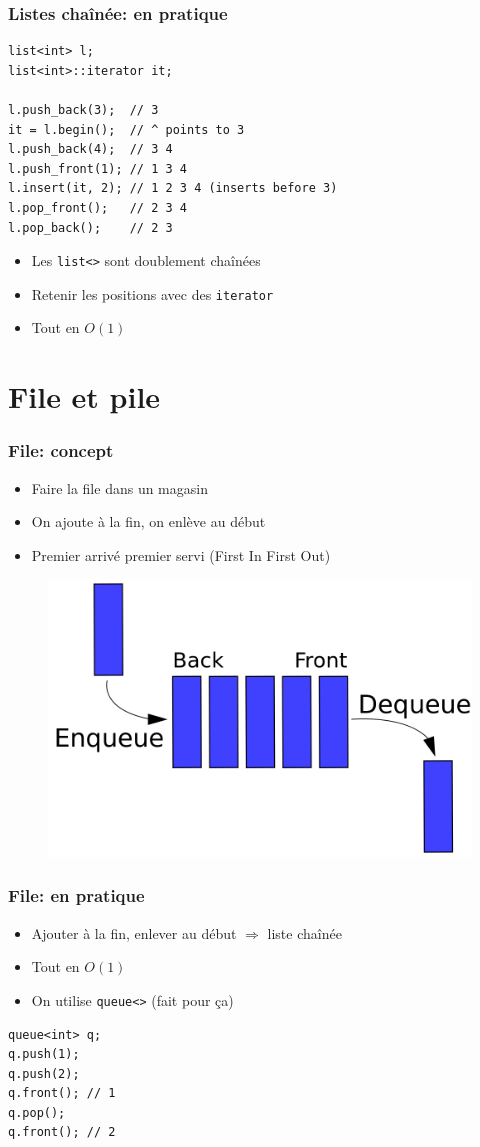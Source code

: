 \documentclass[12pt]{beamer}
\begin{document}
\begin{frame}[fragile]
\frametitle{Listes chaînée: en pratique}
\begin{lstlisting}
list<int> l;
list<int>::iterator it;

l.push_back(3);  // 3
it = l.begin();  // ^ points to 3
l.push_back(4);  // 3 4
l.push_front(1); // 1 3 4
l.insert(it, 2); // 1 2 3 4 (inserts before 3)
l.pop_front();   // 2 3 4
l.pop_back();    // 2 3
\end{lstlisting}
\begin{itemize}
\item Les \texttt{list<>} sont doublement chaînées
\item Retenir les positions avec des \texttt{iterator}
\item Tout en $O(1)$
\end{itemize}
\end{frame}

\section{File et pile}

\begin{frame}
\frametitle{File: concept}
\begin{itemize}
\item Faire la file dans un magasin
\item On ajoute à la fin, on enlève au début
\item Premier arrivé premier servi (First In First Out)
\end{itemize}
\begin{figure}
\centering
\includegraphics[width=.6\textwidth]{img/queue}
\end{figure}
\end{frame}

\begin{frame}[fragile]
\frametitle{File: en pratique}
\begin{itemize}
\item Ajouter à la fin, enlever au début $\Rightarrow$ liste chaînée
\item Tout en $O(1)$
\item On utilise \texttt{queue<>} (fait pour ça)
\end{itemize}
\begin{lstlisting}
queue<int> q;
q.push(1);
q.push(2);
q.front(); // 1
q.pop();
q.front(); // 2
\end{lstlisting}
\end{frame}
\end{document}
